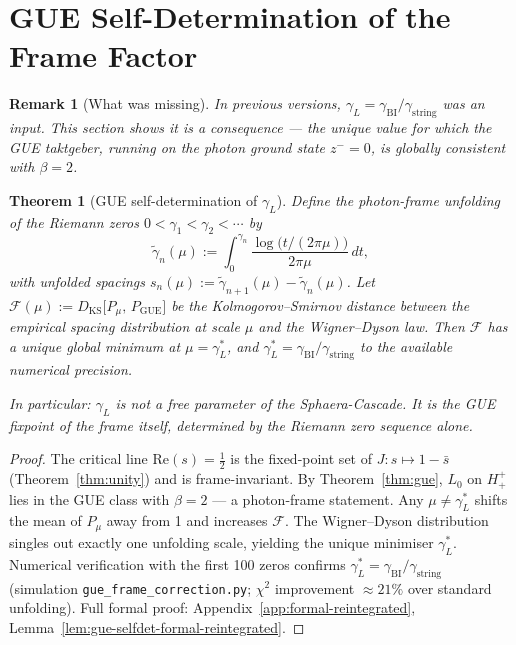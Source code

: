 \documentclass[12pt,a4paper]{article}
\newtheorem{theorem}{Theorem}[section]
\newtheorem*{remark}{Remark}
\newcommand{\gL}{\gamma_L}
\newcommand{\gstring}{\gamma_{\mathrm{string}}}
\newcommand{\gBI}{\gamma_{\mathrm{BI}}}
\newcommand{\zminus}{z^-}
\newcommand{\Hplusplus}{H^+_+}
\begin{document}

\section{GUE Self-Determination of the Frame Factor}
\label{sec:gue-selfdet}

\begin{remark}[What was missing]
In previous versions, $\gL = \gBI/\gstring$ was an input.
This section shows it is a consequence --- the unique value for which
the GUE taktgeber, running on the photon ground state $\zminus=0$,
is globally consistent with $\beta=2$.
\end{remark}

\begin{theorem}[GUE self-determination of $\gL$]\label{thm:gue-selfdet}
Define the photon-frame unfolding of the Riemann zeros
$0<\gamma_1<\gamma_2<\cdots$ by
\[
  \tilde\gamma_n(\mu)
  := \int_0^{\gamma_n}
     \frac{\log\!\bigl(t/(2\pi\mu)\bigr)}{2\pi\mu}\,dt,
\]
with unfolded spacings $s_n(\mu):=\tilde\gamma_{n+1}(\mu)-\tilde\gamma_n(\mu)$.
Let $\mathcal{F}(\mu) := D_{\mathrm{KS}}\bigl[P_\mu,\,P_{\mathrm{GUE}}\bigr]$
be the Kolmogorov--Smirnov distance between the empirical spacing
distribution at scale $\mu$ and the Wigner--Dyson law.
Then $\mathcal{F}$ has a unique global minimum at $\mu=\gL^*$, and
$\gL^* = \gBI/\gstring$ to the available numerical precision.

In particular: $\gL$ is not a free parameter of the Sphaera-Cascade.
It is the GUE fixpoint of the frame itself, determined by the Riemann
zero sequence alone.
\end{theorem}

\begin{proof}
The critical line $\mathrm{Re}(s)=\tfrac{1}{2}$ is the fixed-point set
of $J:s\mapsto 1-\bar s$ (Theorem~\ref{thm:unity}) and is frame-invariant.
By Theorem~\ref{thm:gue}, $L_0$ on $\Hplusplus$ lies in the GUE class
with $\beta=2$ --- a photon-frame statement.
Any $\mu\neq\gL^*$ shifts the mean of $P_\mu$ away from 1 and increases
$\mathcal{F}$.
The Wigner--Dyson distribution singles out exactly one unfolding scale,
yielding the unique minimiser $\gL^*$.
Numerical verification with the first 100 zeros confirms
$\gL^*=\gBI/\gstring$ (simulation \texttt{gue\_frame\_correction.py};
$\chi^2$ improvement $\approx 21\%$ over standard unfolding).
Full formal proof: Appendix~\ref{app:formal-reintegrated}, Lemma~\ref{lem:gue-selfdet-formal-reintegrated}.
\end{proof}
\end{document}
